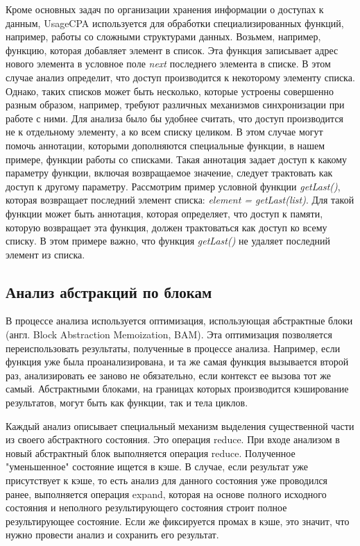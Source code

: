 Кроме основных задач по организации хранения информации о доступах к данным, UsageCPA используется для обработки специализированных функций, например, работы со сложными структурами данных.
Возьмем, например, функцию, которая добавляет элемент в список.
Эта функция записывает адрес нового элемента в условное поле \textit{next} последнего элемента в списке.
В этом случае анализ определит, что доступ производится к некоторому элементу списка.
Однако, таких списков может быть несколько, которые устроены совершенно разным образом, например, требуют различных механизмов синхронизации при работе с ними. 
Для анализа было бы удобнее считать, что доступ производится не к отдельному элементу, а ко всем списку целиком. 
В этом случае могут помочь аннотации, которыми дополняются специальные функции, в нашем примере, функции работы со списками.
Такая аннотация задает доступ к какому параметру функции, включая возвращаемое значение, следует трактовать как доступ к другому параметру.
Рассмотрим пример условной функции \textit{getLast()}, которая возвращает последний элемент списка: \textit{element = getLast(list)}.
Для такой функции может быть аннотация, которая определяет, что доступ к памяти, которую возвращает эта функция, должен трактоваться как доступ ко всему списку. 
В этом примере важно, что функция \textit{getLast()} не удаляет последний элемент из списка.

\subsection{Анализ абстракций по блокам} \label{subsect_impl_bam}

В процессе анализа используется оптимизация, использующая абстрактные блоки (англ. Block Abstraction Memoization, BAM). 
Эта оптимизация позволяется переиспользовать результаты, полученные в процессе анализа.
Например, если функция уже была проанализирована, и та же самая функция вызывается второй раз, анализировать ее заново не обязательно, если контекст ее вызова тот же самый.
Абстрактными блоками, на границах которых производится кэширование результатов, могут быть как функции, так и тела циклов. 

Каждый анализ описывает специальный механизм выделения существенной части из своего абстрактного состояния. Это операция reduce. 
При входе анализом в новый абстрактный блок выполняется операция reduce. Полученное "уменьшенное" состояние ищется в кэше.
В случае, если результат уже присутствует к кэше, то есть анализ для данного состояния уже проводился ранее, выполняется операция expand, которая на основе полного исходного состояния и неполного результирующего состояния строит полное результирующее состояние. 
Если же фиксируется промах в кэше, это значит, что нужно провести анализ и сохранить его результат. 

